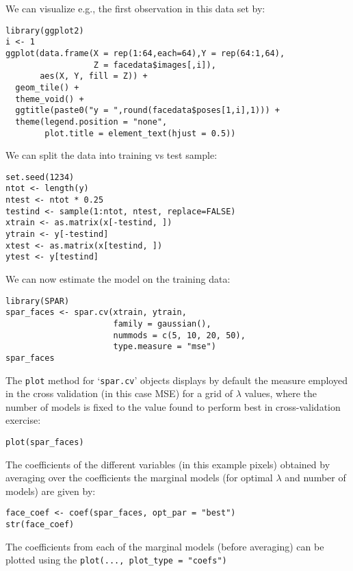 \documentclass[
  article]{jss}
\begin{document}
We can visualize e.g., the first observation in this data set by:

\begin{verbatim}
library(ggplot2)
i <- 1
ggplot(data.frame(X = rep(1:64,each=64),Y = rep(64:1,64),
                  Z = facedata$images[,i]),
       aes(X, Y, fill = Z)) +
  geom_tile() +
  theme_void() +
  ggtitle(paste0("y = ",round(facedata$poses[1,i],1))) +
  theme(legend.position = "none",
        plot.title = element_text(hjust = 0.5))
\end{verbatim}

We can split the data into training vs test sample:

\begin{verbatim}
set.seed(1234)
ntot <- length(y)
ntest <- ntot * 0.25
testind <- sample(1:ntot, ntest, replace=FALSE)
xtrain <- as.matrix(x[-testind, ])
ytrain <- y[-testind]
xtest <- as.matrix(x[testind, ])
ytest <- y[testind]
\end{verbatim}

We can now estimate the model on the training data:

\begin{verbatim}
library(SPAR)
spar_faces <- spar.cv(xtrain, ytrain,
                      family = gaussian(),
                      nummods = c(5, 10, 20, 50),
                      type.measure = "mse")
spar_faces
\end{verbatim}

The \texttt{plot} method for `\texttt{spar.cv}' objects displays by
default the measure employed in the cross validation (in this case MSE)
for a grid of \(\lambda\) values, where the number of models is fixed to
the value found to perform best in cross-validation exercise:

\begin{verbatim}
plot(spar_faces)
\end{verbatim}

The coefficients of the different variables (in this example pixels)
obtained by averaging over the coefficients the marginal models (for
optimal \(\lambda\) and number of models) are given by:

\begin{verbatim}
face_coef <- coef(spar_faces, opt_par = "best")
str(face_coef)
\end{verbatim}

The coefficients from each of the marginal models (before averaging) can
be plotted using the \texttt{plot(...,\ plot\_type\ =\ "coefs")}
\end{document}
